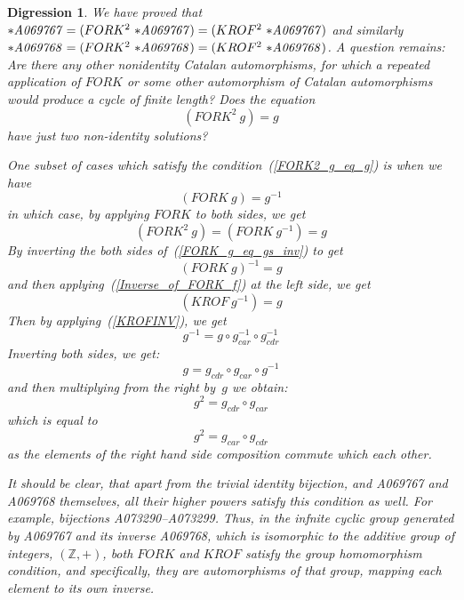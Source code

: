 \documentclass[11pt]{article} %
\newtheorem{digression}{Digression}
\newcommand{\eqn}[1]{(\ref{#1})}
\newcommand{\ZZ}{{\mathbb Z}}
\newcommand{\eeq}{\end{equation}}
\newcommand{\beql}[1]{\begin{equation}\label{#1}}
\newcommand{\autname}[1]{{\it *#1}}
\newcommand{\funapply}{\ensuremath{\circ}}
\begin{document}
\begin{digression}
\normalfont
We have proved that $\autname{A069767} = (FORK^{2}~\autname{A069767}) = (KROF^{2}~\autname{A069767})$
and similarly $\autname{A069768} = (FORK^{2}~\autname{A069768}) = (KROF^{2}~\autname{A069768})$.
A question remains: Are there any other nonidentity Catalan automorphisms,
for which a repeated application of $FORK$ or some other
automorphism of Catalan automorphisms %
would produce a cycle of finite length?
Does the equation 
\beql{FORK2_g_eq_g}
(FORK^{2}~g) = g
\eeq
have just two non-identity solutions?

One subset of cases which satisfy the condition~\eqn{FORK2_g_eq_g}
is when we have
\beql{FORK_g_eq_gs_inv}
(FORK~g)=g^{-1}
\eeq
in which case, by applying $FORK$ to both sides, we get
\beql{FORK2_g_eq_gs_inv}
(FORK^2~g)=(FORK~g^{-1})=g
\eeq
By inverting the both sides of~\eqn{FORK_g_eq_gs_inv} to get
\beql{FORK_g_inv_eq_g}
(FORK~g)^{-1}=g
\eeq
and then applying~\eqn{Inverse_of_FORK_f} at the left side, we get
\beql{KROF_gs_inv_eq_g}
(KROF~g^{-1})=g
\eeq
Then by applying~\eqn{KROFINV}, we get
\beql{FORK_eq_after_KROFINV}
g^{-1} = g \funapply g^{-1}_{car} \funapply g^{-1}_{cdr}
\eeq
Inverting both sides, we get:
\beql{FORK_eq_after_KROFINV2}
g = g_{cdr} \funapply g_{car} \funapply g^{-1}
\eeq
and then multiplying from the right by~$g$ we obtain:
\beql{FORK_eq_after_KROFINV3}
g^2 = g_{cdr} \funapply g_{car}
\eeq
which is equal to 
\beql{FORK_eq_after_KROFINV4}
g^2 = g_{car} \funapply g_{cdr}
\eeq
as the elements of the right hand side composition commute which each other.

It should be clear, that apart from the trivial identity bijection,
and \autname{A069767} and \autname{A069768} themselves, all their
higher powers satisfy this condition as well.
For example, bijections \autname{A073290}--\autname{A073299}.
Thus, in the infnite cyclic group generated by \autname{A069767} and
its inverse \autname{A069768}, which is isomorphic to the additive group
of integers, $(\ZZ,+)$, both $FORK$ and $KROF$ satisfy the group
homomorphism condition, and specifically, they are automorphisms
of that group, mapping each element to its own inverse.


\end{digression}
\end{document}
